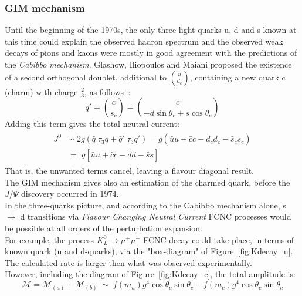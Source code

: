 \subsubsection{GIM mechanism}
\label{sec:gim}
Until the beginning of the 1970s, the only three light quarks u, d and s known at this time could explain the observed hadron spectrum and the observed weak decays of pions
and kaons were mostly in good agreement with the predictions of the \textit{Cabibbo mechanism}.
Glashow, Iliopoulos and Maiani proposed the existence of a second orthogonal doublet, additional to $\binom{u}{d_c}$,  containing a new quark c (charm) with charge $\frac{2}{3}$, as follows~\cite{gim}:
\begin{equation} 
q' = \binom{c}{s_c} = \binom{c}{-d\sin\theta_{c}+s\cos\theta_c}
\end{equation}
Adding this term gives the total neutral current:
\begin {align}
\begin{split}
	J^{0} & \sim \; 2g (\bar{q} \; \tau_{3}q+ \bar{q}' \; \tau_{3}q')  = g(\bar{u} u + \bar{c}c - \bar{d}_{c} d_{c}- \bar{s}_{c} s_{c}) \\
	& = \; g[ \bar{u} u + \bar{c}c - \bar{d} d  - \bar{s}s ]
\end{split}						
\end{align}
That is, the unwanted terms cancel, leaving a flavour diagonal result.
\vspace{\baselineskip}
\\The GIM mechanism gives also an estimation of the charmed quark, before the $J/\Psi$ discovery occurred in 1974.\\
In the three-quarks picture, and according to the Cabibbo mechanism alone, s $\rightarrow$ d transitions via \textit{Flavour Changing Neutral Current} FCNC processes would be possible at all orders of the perturbation expansion. \\
For example, the process $K^{0}_{L}\rightarrow \mu^{+} \mu^{-}$ FCNC decay could take place, in terms of known quark (u and d-quarks), via the "box-diagram" of Figure~\ref{fig:Kdecay_u}.\\
The calculated rate is larger then what was observed experimentally. 
\vspace{\baselineskip}
\\However, including the diagram of Figure~\ref{fig:Kdecay_c}, the total amplitude is:
\begin{equation} 
\mathcal{M} = \mathcal{M}_{(a)} +\mathcal{M}_{(b)} \;\sim\;f(m_u)g^{4}\cos\theta_{c}\sin\theta_{c} - f(m_c)g^{4}\cos\theta_{c}\sin\theta_{c}
\end{equation}
